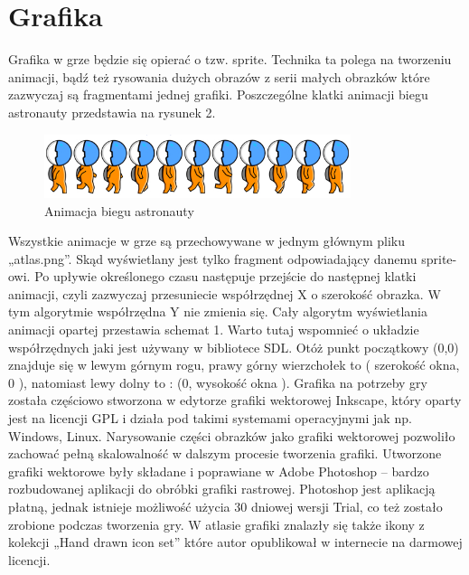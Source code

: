 \section{Grafika}

Grafika w grze będzie się opierać o tzw. sprite. Technika ta polega na tworzeniu animacji, bądź też rysowania dużych obrazów z serii małych obrazków
które zazwyczaj są fragmentami jednej grafiki. Poszczególne klatki animacji biegu astronauty przedstawia na rysunek 2.

\begin{figure}[h]
    \centering
    \includegraphics[width=0.8\textwidth,natwidth=410,natheight=142]{./Pictures/astroRun.jpg}
    \caption{Animacja biegu astronauty}
\end{figure}

Wszystkie animacje w grze są przechowywane w jednym głównym pliku „atlas.png”. Skąd wyświetlany jest tylko fragment odpowiadający danemu sprite-owi.
Po upływie określonego czasu następuje przejście do następnej klatki animacji, czyli zazwyczaj przesuniecie współrzędnej X o szerokość obrazka. W tym
algorytmie współrzędna Y nie zmienia się. Cały algorytm wyświetlania animacji opartej przestawia schemat 1.
Warto tutaj wspomnieć o układzie współrzędnych jaki jest używany w bibliotece SDL. Otóż punkt początkowy (0,0) znajduje się w lewym górnym
rogu, prawy górny wierzchołek to ( szerokość okna, 0 ), natomiast lewy dolny to : (0, wysokość okna ). Grafika na potrzeby gry została częściowo
stworzona w edytorze grafiki wektorowej Inkscape, który oparty jest na licencji GPL i działa pod takimi systemami operacyjnymi jak np. Windows, Linux.
Narysowanie części obrazków jako grafiki wektorowej pozwoliło zachować pełną skalowalność w dalszym procesie tworzenia grafiki. Utworzone grafiki
wektorowe były składane i poprawiane w Adobe Photoshop – bardzo rozbudowanej aplikacji do obróbki grafiki rastrowej. Photoshop jest aplikacją płatną,
jednak istnieje możliwość użycia 30 dniowej wersji Trial, co też zostało zrobione podczas tworzenia gry. W atlasie grafiki znalazły się także ikony z
kolekcji „Hand drawn icon set” które autor opublikował w internecie  na darmowej licencji.

